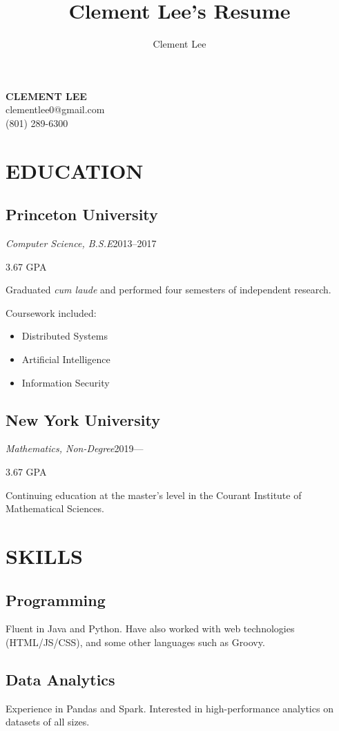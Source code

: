 \documentclass[11pt]{article}
\title{Clement Lee's Resume}
\author{Clement Lee}
\date{}
\begin{document}
{\Huge\textbf{CLEMENT LEE}}
\smallskip\\
clementlee0@gmail.com\\
(801) 289-6300\\

\begin{minipage}[t]{0.40\textwidth}
  \section*{\LARGE EDUCATION}
  \subsection*{Princeton University}
  \emph{Computer Science, B.S.E}\hfill 2013--2017
  
  \hfill 3.67 GPA
  \smallskip

  Graduated \emph{cum laude} and performed four semesters of independent research.

  Coursework included:
  \begin{itemize}
    \item Distributed Systems
    \item Artificial Intelligence
    \item Information Security
  \end{itemize}

  \medskip
  \subsection*{New York University}
  \emph{Mathematics, Non-Degree}\hfill2019---

  \hfill 3.67 GPA
  \smallskip
  
  Continuing education at the master's level in the Courant Institute of Mathematical Sciences. 

  \bigskip
  \section*{\LARGE SKILLS}

  \subsection*{Programming}
  Fluent in Java and Python.
  Have also worked with web technologies (HTML/JS/CSS), and some other languages such as Groovy.

  \medskip
  \subsection*{Data Analytics}
  Experience in Pandas and Spark.
  Interested in high-performance analytics on datasets of all sizes.


\end{minipage}
\end{document}
